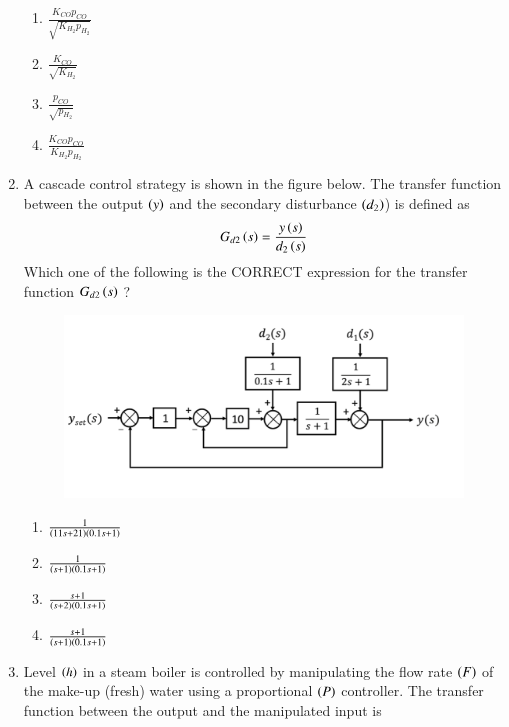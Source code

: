 \documentclass[journal,12pt,onecolumn]{IEEEtran}
\theoremstyle{remark}
\begin{document}
\begin{enumerate}
\hfill{}
   \begin{enumerate}
       \item $\frac{K_{CO}p_{CO}}{\sqrt{K_{H_2}p_{H_2}}}$
       \item $\frac{K_{CO}}{\sqrt{K_{H_2}}}$
       \item $\frac{p_{CO}}{\sqrt{p_{H_2}}}$
       \item $\frac{K_{CO}p_{CO}}{K_{H_2}p_{H_2}}$
   \end{enumerate}
   
    \item A cascade control strategy is shown in the figure below. The transfer function between the output $\left(y\right)$ and the secondary disturbance $\left(d_2\right)$) is defined as
    \begin{align*}
        G_{d2}\left(s\right) = \frac{y\left(s\right)}{d_2\left(s\right)}
    \end{align*}
    Which one of the following is the CORRECT expression for the transfer function $G_{d2}\left(s\right)$ ?
    
    \hfill{}
    \begin{figure}[H]
        \centering
        \includegraphics[width=0.8\columnwidth]{figs/44.png}
        \caption{}
        \label{fig:44}
    \end{figure}
    \begin{enumerate}
        \item $\frac{1}{\left(11s+21\right)\left(0.1s+1\right)}$
        \item $\frac{1}{\left(s+1\right)\left(0.1s+1\right)}$
        \item $\frac{s+1}{\left(s+2\right)\left(0.1s+1\right)}$
        \item $\frac{s+1}{\left(s+1\right)\left(0.1s+1\right)}$
    \end{enumerate}
    \newpage
    \item Level $\left(h\right)$ in a steam boiler is controlled by manipulating the flow rate $\left(F\right)$ of the make-up (fresh) water using a proportional $\left(P\right)$ controller. The transfer function between the output and the manipulated input is 


\end{enumerate}
\end{document}
